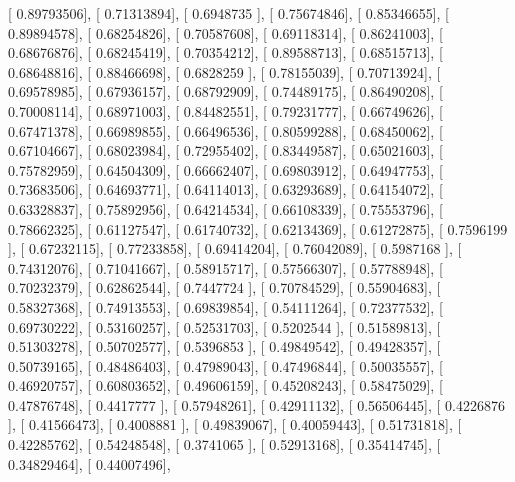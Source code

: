 \documentclass{article}
\begin{document}
       [ 0.89793506],
       [ 0.71313894],
       [ 0.6948735 ],
       [ 0.75674846],
       [ 0.85346655],
       [ 0.89894578],
       [ 0.68254826],
       [ 0.70587608],
       [ 0.69118314],
       [ 0.86241003],
       [ 0.68676876],
       [ 0.68245419],
       [ 0.70354212],
       [ 0.89588713],
       [ 0.68515713],
       [ 0.68648816],
       [ 0.88466698],
       [ 0.6828259 ],
       [ 0.78155039],
       [ 0.70713924],
       [ 0.69578985],
       [ 0.67936157],
       [ 0.68792909],
       [ 0.74489175],
       [ 0.86490208],
       [ 0.70008114],
       [ 0.68971003],
       [ 0.84482551],
       [ 0.79231777],
       [ 0.66749626],
       [ 0.67471378],
       [ 0.66989855],
       [ 0.66496536],
       [ 0.80599288],
       [ 0.68450062],
       [ 0.67104667],
       [ 0.68023984],
       [ 0.72955402],
       [ 0.83449587],
       [ 0.65021603],
       [ 0.75782959],
       [ 0.64504309],
       [ 0.66662407],
       [ 0.69803912],
       [ 0.64947753],
       [ 0.73683506],
       [ 0.64693771],
       [ 0.64114013],
       [ 0.63293689],
       [ 0.64154072],
       [ 0.63328837],
       [ 0.75892956],
       [ 0.64214534],
       [ 0.66108339],
       [ 0.75553796],
       [ 0.78662325],
       [ 0.61127547],
       [ 0.61740732],
       [ 0.62134369],
       [ 0.61272875],
       [ 0.7596199 ],
       [ 0.67232115],
       [ 0.77233858],
       [ 0.69414204],
       [ 0.76042089],
       [ 0.5987168 ],
       [ 0.74312076],
       [ 0.71041667],
       [ 0.58915717],
       [ 0.57566307],
       [ 0.57788948],
       [ 0.70232379],
       [ 0.62862544],
       [ 0.7447724 ],
       [ 0.70784529],
       [ 0.55904683],
       [ 0.58327368],
       [ 0.74913553],
       [ 0.69839854],
       [ 0.54111264],
       [ 0.72377532],
       [ 0.69730222],
       [ 0.53160257],
       [ 0.52531703],
       [ 0.5202544 ],
       [ 0.51589813],
       [ 0.51303278],
       [ 0.50702577],
       [ 0.5396853 ],
       [ 0.49849542],
       [ 0.49428357],
       [ 0.50739165],
       [ 0.48486403],
       [ 0.47989043],
       [ 0.47496844],
       [ 0.50035557],
       [ 0.46920757],
       [ 0.60803652],
       [ 0.49606159],
       [ 0.45208243],
       [ 0.58475029],
       [ 0.47876748],
       [ 0.4417777 ],
       [ 0.57948261],
       [ 0.42911132],
       [ 0.56506445],
       [ 0.4226876 ],
       [ 0.41566473],
       [ 0.4008881 ],
       [ 0.49839067],
       [ 0.40059443],
       [ 0.51731818],
       [ 0.42285762],
       [ 0.54248548],
       [ 0.3741065 ],
       [ 0.52913168],
       [ 0.35414745],
       [ 0.34829464],
       [ 0.44007496],
\end{document}
